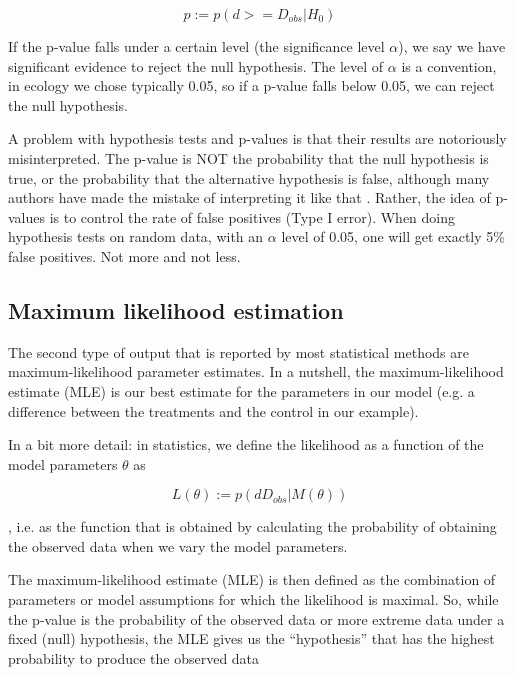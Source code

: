 \documentclass[a4paper,twoside]{tufte-book}\usepackage[]{graphicx}\usepackage[]{color}
\begin{document}
\begin{equation}
p := p(d >= D_{obs} | H_0)
\end{equation}

If the p-value falls under a certain level (the significance level $\alpha$), we say we have significant evidence to reject the null hypothesis. The level of $\alpha$ is a convention, in ecology we chose typically 0.05, so if a p-value falls below 0.05, we can reject the null hypothesis.  

A problem with hypothesis tests and p-values is that their results are notoriously misinterpreted. The p-value is NOT the probability that the null hypothesis is true, or the probability that the alternative hypothesis is false, although many authors have made the mistake of interpreting it like that \citep[][]{Cohen-earthisround-1994}. Rather, the idea of p-values is to control the rate of false positives (Type I error). When doing hypothesis tests on random data, with an $\alpha$ level of 0.05, one will get exactly 5\% false positives. Not more and not less.  

\subsection{Maximum likelihood estimation}

The second type of output that is reported by most statistical methods are maximum-likelihood parameter estimates. In a nutshell, the maximum-likelihood estimate (MLE) is our best estimate for the parameters in our model (e.g. a difference between the treatments and the control in our example). 

In a bit more detail: in statistics, we define the likelihood as a function of the model parameters $\theta$ as  

\begin{equation}
L(\theta) := p(dD_{obs} | M(\theta))
\end{equation}

, i.e. as the function that is obtained by calculating the probability of obtaining the observed data when we vary the model parameters.

The maximum-likelihood estimate (MLE) is then defined as the combination of parameters or model assumptions for which the likelihood is maximal. So, while the p-value is the probability of the observed data or more extreme data under a fixed (null) hypothesis, the MLE gives us the ``hypothesis'' that has the highest probability to produce the observed data  
\end{document}

